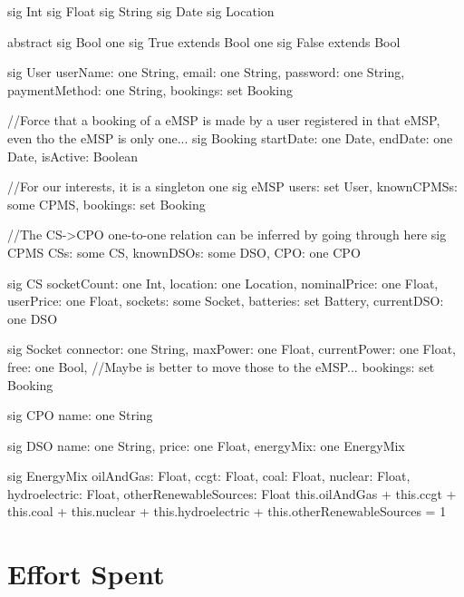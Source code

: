 \documentclass[11pt]{article}
\begin{document}
\begin{ffcode}
    sig Int {}
    sig Float {}
    sig String {}
    sig Date {}
    sig Location {}
    
    abstract sig Bool {}
    one sig True extends Bool {}
    one sig False extends Bool {}
    
    sig User {
        userName: one String,
        email: one String,
        password: one String,
        paymentMethod: one String,
        bookings: set Booking
    }
    
    //Force that a booking of a eMSP is made by a user registered in that eMSP, even tho the eMSP is only one...
    sig Booking {
        startDate: one Date,
        endDate: one Date,
        isActive: Boolean
    }
    
    //For our interests, it is a singleton
    one sig eMSP {
        users: set User,
        knownCPMSs: some CPMS,
        bookings: set Booking
    }
    
    //The CS->CPO one-to-one relation can be inferred by going through here
    sig CPMS {
        CSs: some CS,
        knownDSOs: some DSO,
        CPO: one CPO
    }
    
    sig CS {
        socketCount: one Int,
        location: one Location,
        nominalPrice: one Float,
        userPrice: one Float,
        sockets: some Socket,
        batteries: set Battery,
        currentDSO: one DSO
    }
    
    sig Socket {
        connector: one String,
        maxPower: one Float,
        currentPower: one Float,
        free: one Bool,
        //Maybe is better to move those to the eMSP...
        bookings: set Booking
    }
    
    sig CPO {
        name: one String
    }
    
    sig DSO {
        name: one String,
        price: one Float,
        energyMix: one EnergyMix
    }
    
    sig EnergyMix {
        oilAndGas: Float,
        ccgt: Float,
        coal: Float,
        nuclear: Float,
        hydroelectric: Float,
        otherRenewableSources: Float
    } {
        this.oilAndGas + this.ccgt + this.coal + this.nuclear + this.hydroelectric + this.otherRenewableSources = 1
    }
    
\end{ffcode}

\section{Effort Spent}
\label{section:effort}
\end{document}
